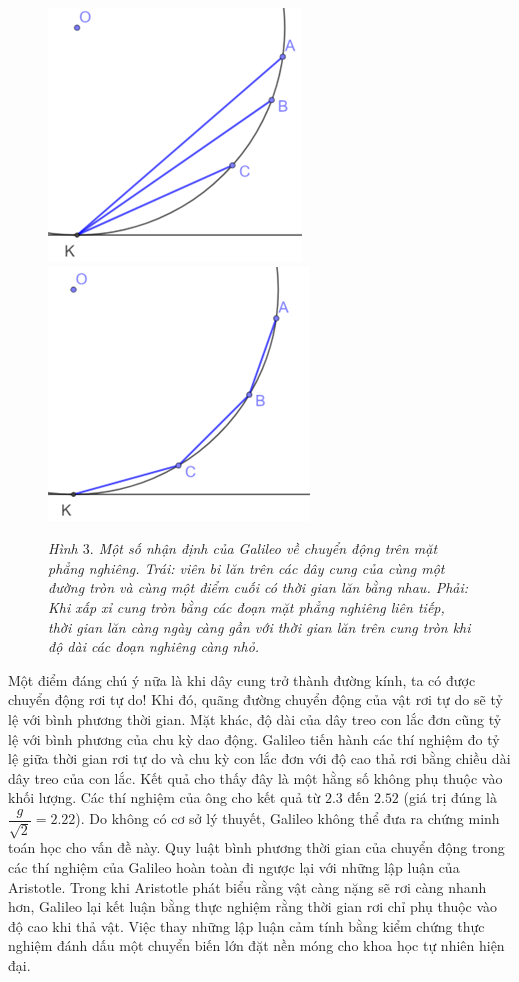 \begin{multicols}{2}
\begin{figure}[H]
		\includegraphics[height= 0.45\linewidth]{3a}
		\includegraphics[height= 0.45\linewidth]{3b}
		\caption{\small\textit{\color{timhieukhoahoc}Hình $3.$ Một số nhận định của Galileo về chuyển động trên mặt phẳng nghiêng. Trái: viên bi lăn trên các dây cung của cùng một đường tròn và cùng một điểm cuối có thời gian lăn bằng nhau. Phải: Khi xấp xỉ cung tròn bằng các đoạn mặt phẳng nghiêng liên tiếp, thời gian lăn càng ngày càng gần với thời gian lăn trên cung tròn khi độ dài các đoạn nghiêng càng nhỏ.}}
		\vspace*{-10pt}
	\end{figure}
	Một điểm đáng chú ý nữa là khi dây cung trở thành đường kính, ta có được chuyển động rơi tự do! Khi đó, quãng đường chuyển động của vật rơi tự do sẽ tỷ lệ với bình phương thời gian. Mặt khác, độ dài của dây treo con lắc đơn cũng tỷ lệ với bình phương của chu kỳ dao động. Galileo tiến hành các thí nghiệm đo tỷ lệ giữa thời gian rơi tự do và chu kỳ con lắc đơn với độ cao thả rơi bằng chiều dài dây treo của con lắc. Kết quả cho thấy đây là một hằng số không phụ thuộc vào khối lượng. Các thí nghiệm của ông cho kết quả từ $2{.}3$ đến $2{.}52$ (giá trị đúng là $\dfrac{g}{\sqrt{2}}=2{.}22$). Do không có cơ sở lý thuyết, Galileo không thể đưa ra chứng minh toán học cho vấn đề này.
	\vskip 0.1cm
	Quy luật bình phương thời gian của chuyển động trong các thí nghiệm của Galileo hoàn toàn đi ngược lại với những lập luận của Aristotle. Trong khi Aristotle phát biểu rằng vật càng nặng sẽ rơi càng nhanh hơn, Galileo lại kết luận bằng thực nghiệm rằng thời gian rơi chỉ phụ thuộc vào độ cao khi thả vật. Việc thay những lập luận cảm tính bằng kiểm chứng thực nghiệm đánh dấu một chuyển biến lớn đặt nền móng cho khoa học tự nhiên hiện đại.

\end{multicols}
